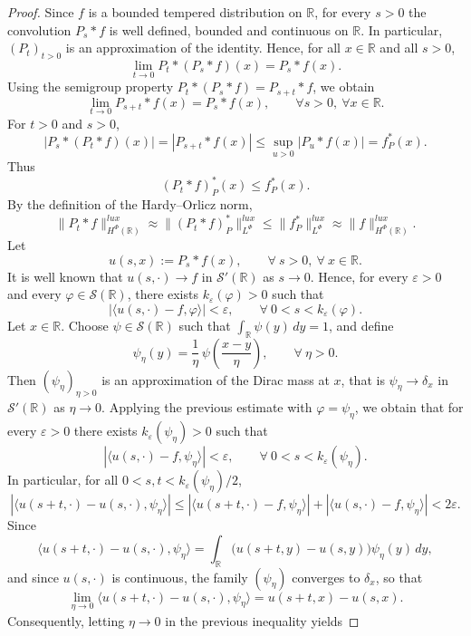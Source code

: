\documentclass[10pt,a4paper]{amsart}
\begin{document}
\begin{proof}
Since $f$ is a bounded tempered distribution on $\mathbb{R}$, for every $s>0$ the convolution $P_s*f$ is well defined, bounded and continuous on $\mathbb{R}$. In particular, $(P_t)_{t>0}$ is an approximation of the identity. Hence, for all $x\in\mathbb{R}$ and all $s>0$,
\[
\lim_{t\to 0} P_t*(P_s*f)(x)=P_s*f(x).
\]
Using the semigroup property $P_t*(P_s*f)=P_{s+t}*f$, we obtain
\begin{equation}\label{eq:pointwise_limit}
\lim_{t\to 0} P_{s+t}*f(x)=P_s*f(x),
\qquad \forall s>0,\ \forall x\in\mathbb{R}.
\end{equation}
For $t>0$ and $s>0$,
\[
|P_s*(P_t*f)(x)|
=
|P_{s+t}*f(x)|
\le
\sup_{u>0}|P_u*f(x)|
=
f_P^*(x).
\]
Thus
\[
(P_t*f)_P^*(x)\le f_P^*(x).
\]
By the definition of the Hardy–Orlicz norm,
\[
\|P_t*f\|_{H^\Phi(\mathbb{R})}^{lux}
\approx
\|(P_t*f)_P^*\|_{L^\Phi}^{lux}
\le
\|f_P^*\|_{L^\Phi}^{lux}
\approx
\|f\|_{H^\Phi(\mathbb{R})}^{lux}.
\]
Let
\[
u(s,x):=P_s*f(x), \qquad \forall~s>0,\ \forall~ x\in\mathbb{R}.
\]
It is well known that $u(s,\cdot)\longrightarrow f$
in  $\mathscr S'(\mathbb{R})$  as  $s\to 0$.
Hence, for every $\varepsilon>0$ and every $\varphi\in\mathscr S(\mathbb{R})$, there exists
$k_{\varepsilon}(\varphi)>0$ such that
\[
|\langle u(s,\cdot)-f,\varphi\rangle|
<
\varepsilon,
\qquad \forall~ 0<s<k_{\varepsilon}(\varphi).
\]
Let $x\in\mathbb{R}$.  
Choose $\psi\in\mathscr S(\mathbb{R})$ such that
$\int_{\mathbb R}\psi(y)\,dy=1$,
and define
\[
\psi_\eta(y)=\frac1\eta\,\psi\!\left(\frac{x-y}{\eta}\right),
\qquad \forall~ \eta>0 .
\]
Then $(\psi_\eta)_{\eta>0}$ is an approximation of the Dirac mass at $x$, that is $\psi_\eta\longrightarrow \delta_x$ in  $\mathscr S'(\mathbb{R})$  as  $\eta\to 0$.
Applying the previous estimate with $\varphi=\psi_\eta$, we obtain that for every
$\varepsilon>0$ there exists $k_{\varepsilon}(\psi_\eta)>0$ such that
\[
|\langle u(s,\cdot)-f,\psi_\eta\rangle|
<
\varepsilon,
\qquad \forall~ 0<s<k_{\varepsilon}(\psi_\eta).
\]
In particular, for all $0<s,t<k_{\varepsilon}(\psi_\eta)/2$,
\[
|\langle u(s+t,\cdot)-u(s,\cdot),\psi_\eta\rangle|
\le
|\langle u(s+t,\cdot)-f,\psi_\eta\rangle|
+
|\langle u(s,\cdot)-f,\psi_\eta\rangle|
<
2\varepsilon .
\]
Since
\[
\langle u(s+t,\cdot)-u(s,\cdot),\psi_\eta\rangle
=
\int_{\mathbb R}
\bigl(u(s+t,y)-u(s,y)\bigr)\psi_\eta(y)\,dy,
\]
and since $u(s,\cdot)$ is continuous, the family $(\psi_\eta)$ converges to $\delta_x$,
so that
\[
\lim_{\eta\to 0}
\langle u(s+t,\cdot)-u(s,\cdot),\psi_\eta\rangle
=
u(s+t,x)-u(s,x).
\]
Consequently, letting $\eta\to 0$ in the previous inequality yields

\end{proof}
\end{document}
